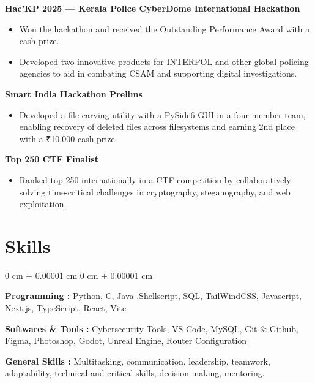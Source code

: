 \documentclass[10pt, a4paper]{article}
\newenvironment{highlights}{
    \begin{itemize}[
        topsep=0.10 cm,
        parsep=0.10 cm,
        partopsep=0pt,
        itemsep=0pt,
        leftmargin=0 cm + 10pt
    ]
}{
    \end{itemize}
} %
\newenvironment{onecolentry}{
    \begin{adjustwidth}{
        0 cm + 0.00001 cm
    }{
        0 cm + 0.00001 cm
    }
}{
    \end{adjustwidth}
} %
\begin{document}
        \begin{samepage}  
                \textbf{Hac'KP 2025 — Kerala Police CyberDome International Hackathon}
                \begin{highlights}
                    \item Won the hackathon and received the Outstanding Performance Award with a cash prize.
                    \item Developed two innovative products for INTERPOL and other global policing agencies to aid in combating CSAM and supporting digital investigations.
                \end{highlights}
                
                \textbf{Smart India Hackathon Prelims}
                \begin{highlights}
                    \item Developed a file carving utility with a PySide6 GUI in a four-member team, enabling recovery of deleted files across filesystems and earning 2nd place with a ₹10,000 cash prize.
                \end{highlights}

                \textbf{Top 250 CTF Finalist}
                \begin{highlights}
                    \item Ranked top 250 internationally in a CTF competition by collaboratively solving time-critical challenges in cryptography, steganography, and web exploitation.
                \end{highlights}
                
        \end{samepage}

    \section{Skills}

    \begin{onecolentry}
        
        \textbf{Programming :} Python, C, Java ,Shellscript, SQL, TailWindCSS, Javascript, Next.js, TypeScript, React, Vite 

        \vspace{0.05 cm}

        \textbf{Softwares \& Tools :} Cybersecurity Tools, VS Code, MySQL, Git \& Github, Figma, Photoshop,  Godot, Unreal Engine, Router Configuration

        \vspace{0.05 cm}

        \textbf{General Skills :}  Multitasking, communication, leadership, teamwork, adaptability, technical and critical skills, decision-making, mentoring.
        
    \end{onecolentry}
    
\end{document}
